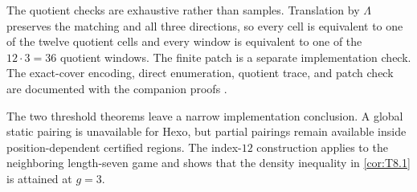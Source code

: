 The quotient checks are exhaustive rather than samples.  Translation by
$\Lambda$ preserves the matching and all three directions, so every cell is
equivalent to one of the twelve quotient cells and every window is equivalent
to one of the $12\cdot3=36$ quotient windows.  The finite patch is a separate
implementation check.  The exact-cover encoding, direct enumeration, quotient
trace, and patch check are documented with the companion proofs
\cite{hexobot-companions}.

The two threshold theorems leave a narrow implementation conclusion.  A
global static pairing is unavailable for Hexo, but partial pairings remain
available inside position-dependent certified regions.  The index-$12$
construction applies to the neighboring length-seven game and shows that the
density inequality in \cref{cor:T8.1} is attained at $g=3$.
